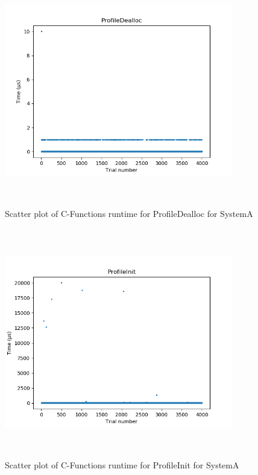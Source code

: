 \begin{figure}[H]
	\centering
	\includegraphics[width=10cm,height=10cm,keepaspectratio]{RuntimeResults_SystemA/CFunctions/ProfileDealloc_scatter.png}
	\caption{Scatter plot of C-Functions runtime for ProfileDealloc for SystemA}
	\label{fig:C-Functions|ProfileDealloc|SystemA}
\end{figure}

\begin{figure}[H]
	\centering
	\includegraphics[width=10cm,height=10cm,keepaspectratio]{RuntimeResults_SystemA/CFunctions/ProfileInit_scatter.png}
	\caption{Scatter plot of C-Functions runtime for ProfileInit for SystemA}
	\label{fig:C-Functions|ProfileInit|SystemA}
\end{figure}

